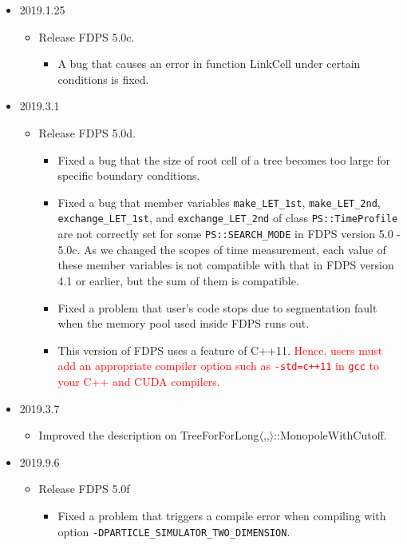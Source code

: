 \begin{itemize}
  \item 2019.1.25
    \begin{itemize}
    \item Release FDPS 5.0c.
       \begin{itemize}
          \item A bug that causes an error in function LinkCell under certain conditions is fixed.
       \end{itemize}
    \end{itemize}

  \item 2019.3.1
    \begin{itemize}
    \item Release FDPS 5.0d.
       \begin{itemize}
          \item Fixed a bug that the size of root cell of a tree becomes too large for specific boundary conditions.
          \item Fixed a bug that member variables \texttt{make\_LET\_1st}, \texttt{make\_LET\_2nd}, \newline \texttt{exchange\_LET\_1st}, and  \texttt{exchange\_LET\_2nd} of class \texttt{PS::TimeProfile} are not correctly set for some \texttt{PS::SEARCH\_MODE} in FDPS version 5.0 - 5.0c. As we changed the scopes of time measurement, each value of these member variables is not compatible with that in FDPS version 4.1 or earlier, but the sum of them is compatible.
          \item Fixed a problem that user's code stops due to segmentation fault when the memory pool used inside FDPS runs out.
          \item This version of FDPS uses a feature of C++11. \textcolor{red}{Hence, users must add an appropriate compiler option such as \texttt{-std=c++11} in \texttt{gcc} to your C++ and CUDA compilers.}
       \end{itemize}
    \end{itemize}
    
  \item 2019.3.7
    \begin{itemize}
    \item Improved the description on TreeForForLong$\langle$,,$\rangle$::MonopoleWithCutoff.
    \end{itemize}

  \item 2019.9.6
    \begin{itemize}
    \item Release FDPS 5.0f
       \begin{itemize}
          \item Fixed a problem that triggers a compile error when compiling with option \texttt{-DPARTICLE\_SIMULATOR\_TWO\_DIMENSION}.
       \end{itemize}
    \end{itemize}


\end{itemize}
